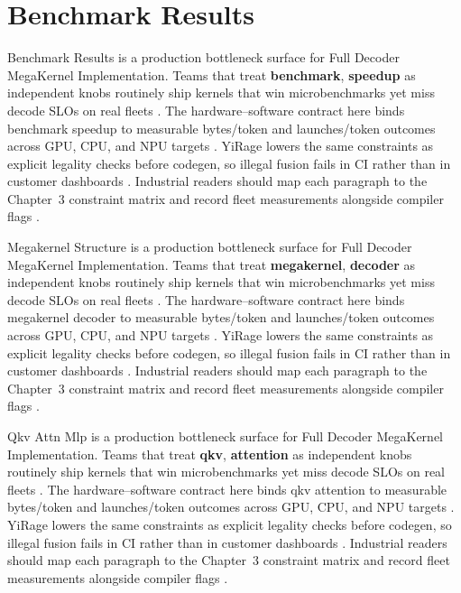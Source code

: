 \section{Benchmark Results}
\label{sec:benchmark_results}

Benchmark Results is a production bottleneck surface for Full Decoder MegaKernel Implementation. Teams that treat \textbf{benchmark}, \textbf{speedup} as independent knobs routinely ship kernels that win microbenchmarks yet miss decode SLOs on real fleets \citep{nvidia2022hopper,amd2024aie}. The hardware--software contract here binds benchmark speedup to measurable bytes/token and launches/token outcomes across GPU, CPU, and NPU targets \citep{semianalysis2024tma,dlbook}. YiRage lowers the same constraints as explicit legality checks before codegen, so illegal fusion fails in CI rather than in customer dashboards \citep{amd2024xdna,dao2022flashattention}. Industrial readers should map each paragraph to the Chapter~3 constraint matrix and record fleet measurements alongside compiler flags \citep{amd2024aie,kwon2023vllm}.

Megakernel Structure is a production bottleneck surface for Full Decoder MegaKernel Implementation. Teams that treat \textbf{megakernel}, \textbf{decoder} as independent knobs routinely ship kernels that win microbenchmarks yet miss decode SLOs on real fleets \citep{taxbreak2026,semianalysis2024tma}. The hardware--software contract here binds megakernel decoder to measurable bytes/token and launches/token outcomes across GPU, CPU, and NPU targets \citep{memoryfloor2026,amd2024xdna}. YiRage lowers the same constraints as explicit legality checks before codegen, so illegal fusion fails in CI rather than in customer dashboards \citep{nvidia2022hopper,amd2024aie}. Industrial readers should map each paragraph to the Chapter~3 constraint matrix and record fleet measurements alongside compiler flags \citep{semianalysis2024tma,dlbook}.

Qkv Attn Mlp is a production bottleneck surface for Full Decoder MegaKernel Implementation. Teams that treat \textbf{qkv}, \textbf{attention} as independent knobs routinely ship kernels that win microbenchmarks yet miss decode SLOs on real fleets \citep{memoryfloor2026,amd2024xdna}. The hardware--software contract here binds qkv attention to measurable bytes/token and launches/token outcomes across GPU, CPU, and NPU targets \citep{nvidia2022hopper,amd2024aie}. YiRage lowers the same constraints as explicit legality checks before codegen, so illegal fusion fails in CI rather than in customer dashboards \citep{semianalysis2024tma,dlbook}. Industrial readers should map each paragraph to the Chapter~3 constraint matrix and record fleet measurements alongside compiler flags \citep{amd2024xdna,dao2022flashattention}.

